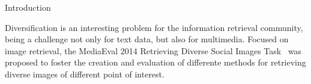 
\begin{section}{Introduction}

Diversification is an interesting problem for the information retrieval community, 
being a challenge not only for text data, but also for multimedia.
Focused on image retrieval, the MediaEval 2014 Retrieving Diverse Social Images Task~\cite{overview14}
was proposed to foster the creation and evaluation of differente methods for retrieving 
diverse images of different point of interest.



\end{section}


